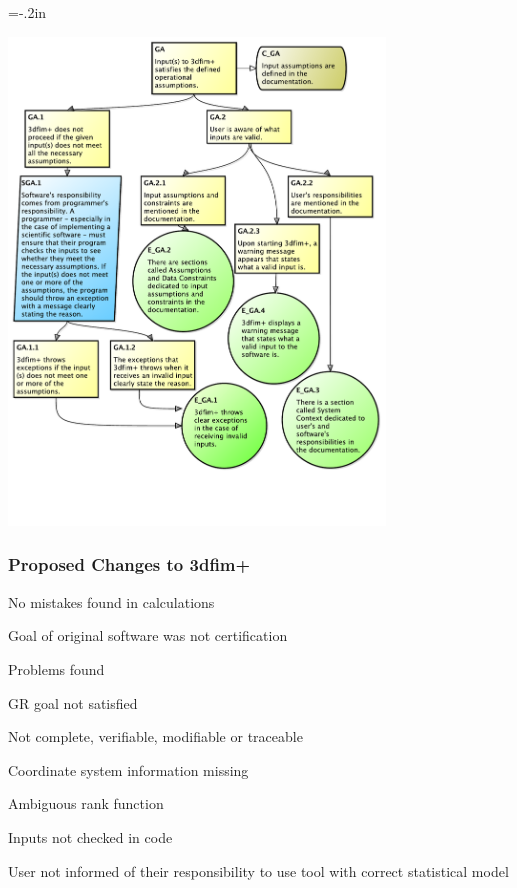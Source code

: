 \documentclass[t,12pt,numbers,fleqn]{beamer}
\begin{document}
\hoffset=-.2in
\begin{frame}[plain]

\includegraphics[width=0.75\textwidth]{../Figures/GSN_GA.pdf}

\end{frame}
\hoffset=0in


\begin{frame}
\frametitle{Proposed Changes to 3dfim+}

\bi
\item No mistakes found in calculations
\item Goal of original software was not certification
\item Problems found
\bi
\item GR goal not satisfied
\bi
\item Not complete, verifiable, modifiable or traceable
\item Coordinate system information missing
\item Ambiguous rank function
\ei
\item Inputs not checked in code
\item User not informed of their responsibility to use tool with correct
  statistical model
\ei
\ei

\end{frame}
\end{document}
